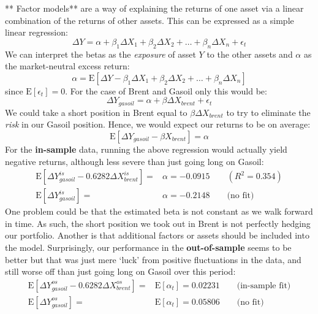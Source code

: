 \documentclass[11pt]{article}
\begin{document}
    ** Factor models** are a way of explaining the returns of one asset via
a linear combination of the returns of other assets. This can be
expressed as a simple linear regression:
\begin{equation}\Delta Y = \alpha + \beta_1 \Delta X_1 + \beta_2 \Delta X_2 + \dots + \beta_n \Delta X_n + \epsilon_t \end{equation}
We can interpret the betas as the \emph{exposure} of asset \(Y\) to the
other assets and \(\alpha\) as the market-neutral excess return:
\begin{equation} \alpha = \mathrm{E}[\Delta Y - \beta_1 \Delta X_1 + \beta_2 \Delta X_2 + \dots + \beta_n \Delta X_n] \end{equation}
since \(\mathrm{E}[\epsilon_t] =0\).
For the case of Brent and Gasoil only this would be:
\begin{equation}\Delta Y_{gasoil} = \alpha + \beta \Delta X_{brent} + \epsilon_t \end{equation}
We could take a short position in Brent equal to
\(\beta \Delta X_{brent}\) to try to eliminate the \emph{risk} in our
Gasoil position. Hence, we would expect our returns to be on average:
\begin{equation}\mathrm{E} [\Delta Y_{gasoil} - \beta X_{brent}] = \alpha \end{equation}
For the \textbf{in-sample} data, running the above regression would
actually yield negative returns, although less severe than just going
long on Gasoil:
\begin{equation}
\begin{array}{rl}
\mathrm{E} [ \Delta Y_{gasoil}^{is}  -0.6282 \Delta X_{brent}^{is}] =  & \alpha   =  -0.0915 \qquad (R^2 = 0.354) \\
\mathrm{E} [ \Delta Y_{gasoil}^{is}]  =  & \alpha   =   
-0.2148  \qquad  \text{(no fit)}
\end{array}
\end{equation}
One problem could be that the estimated beta is not constant as we walk
forward in time. As such, the short position we took out in Brent is not
perfectly hedging our portfolio. Another is that additional factors or
assets should be included into the model.
Surprisingly, our performance in the \textbf{out-of-sample} seems to be
better but that was just mere `luck' from positive fluctuations in the
data, and still worse off than just going long on Gasoil over this period:
\begin{equation}
\begin{array}{rl}
\mathrm{E} [ \Delta Y_{gasoil}^{os}  -0.6282 \Delta X_{brent}^{os}] =  & \mathrm{E}[ \alpha_t]    = 0.02231 \qquad \text{(in-sample fit)}  \\
\mathrm{E} [ \Delta Y_{gasoil}^{os}] =   & \mathrm{E}[ \alpha_t]   =  0.05806  \qquad  \text{(no fit)}
\end{array}
\end{equation}
\end{document}
